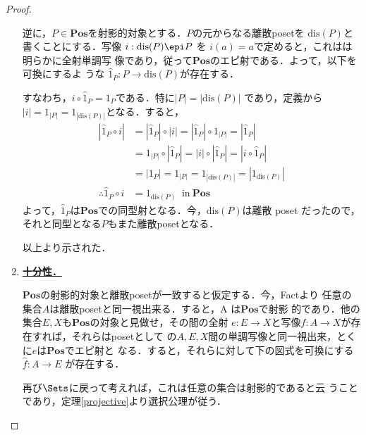 \documentclass[a4j]{ltjsarticle}
\newcommand{\dis}{\mathrm{dis}}
\newcommand{\Pos}{\mathbf{Pos}}
\begin{document}
\begin{proof}
\begin{enumerate}
	逆に，$P \in \Pos$を射影的対象とする．$P$の元からなる離散posetを
	$\dis(P)$と書くことにする．写像 $i:\dis(P) \epi P$ を
	$i(a) = a$で定めると，これはは明らかに全射単調写
	像であり，従って$\Pos$のエピ射である．よって，以下を可換にするよ
	うな $\hat{1}_P: P \to \dis(P)$が存在する．
        \begin{center}
        \end{center}	
すなわち，$i \circ \hat{1}_P = 1_P$である．特に$|P| = |\dis(P)|$
	であり，定義から$|i| = 1_{|P|} = 1_{|\dis(P)|}$となる．すると，
	\begin{align*}
	 | \hat{1}_P \circ i | &= |\hat{1}_P| \circ |i|
	                        = |\hat{1}_P| \circ 1_{|P|}
	                        = |\hat{1}_P|\\
	                       &= 1_{|P|} \circ |\hat{1}_P|
	                        = |i| \circ |\hat{1}_P|
	                        = |i \circ \hat{1}_P| \\ &= |1_P|
	                        = 1_{|P|} = 1_{|\dis(P)|} = |1_{\dis(P)}|\\
	 \therefore \hat{1}_P \circ i &= 1_{\dis(P)}\;\;\text{in}\ \Pos
	\end{align*}
	よって，$\hat{1}_P$は$\Pos$での同型射となる．今，$\dis(P)$は離散
	poset だったので，それと同型となる$P$もまた離散posetとなる．

	以上より示された．
  \item \underline{\bfseries 十分性．}

	$\Pos$の射影的対象と離散posetが一致すると仮定する．今，Factより
	任意の集合$A$は離散posetと同一視出来る．すると，A は$\Pos$で射影
	的であり．他の集合$E, X$も$\Pos$の対象と見做せ，その間の全射
	$e: E \to X$と写像$f: A \to X$が存在すれば，それらはposetとして
	の$A, E, X$間の単調写像と同一視出来，とくに$e$は$\Pos$でエピ射と
	なる．すると，それらに対して下の図式を可換にする$\hat{f}:A\to E$
	が存在する．
        \begin{center}
        \end{center}	
再び$\Sets$に戻って考えれば，これは任意の集合は射影的であると云
	うことであり，定理\ref{projective}より選択公理が従う．
 \end{enumerate}
\end{proof}

\printbibliography[title=参考文献]
\end{document}
